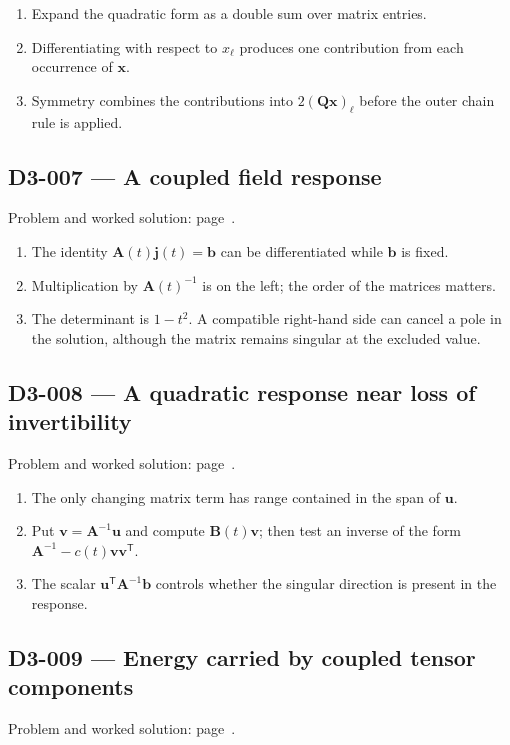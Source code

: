 \documentclass[11pt,oneside,openany]{book}
\begin{document}
\begin{enumerate}
\item Expand the quadratic form as a double sum over matrix entries.
\item Differentiating with respect to \(x_\ell\) produces one contribution from each occurrence of \(\mathbf x\).
\item Symmetry combines the contributions into \(2(\mathbf Q\mathbf x)_\ell\) before the outer chain rule is applied.
\end{enumerate}
\subsection*{D3-007 --- A coupled field response}
\label{hints:D3-007}
Problem and worked solution: page~\pageref{problem:D3-007}.

\begin{enumerate}
\item The identity \(\mathbf A(t)\mathbf j(t)=\mathbf b\) can be differentiated while \(\mathbf b\) is fixed.
\item Multiplication by \(\mathbf A(t)^{-1}\) is on the left; the order of the matrices matters.
\item The determinant is \(1-t^2\). A compatible right-hand side can cancel a pole in the solution, although the matrix remains singular at the excluded value.
\end{enumerate}
\subsection*{D3-008 --- A quadratic response near loss of invertibility}
\label{hints:D3-008}
Problem and worked solution: page~\pageref{problem:D3-008}.

\begin{enumerate}
\item The only changing matrix term has range contained in the span of \(\mathbf u\).
\item Put \(\mathbf v=\mathbf A^{-1}\mathbf u\) and compute \(\mathbf B(t)\mathbf v\); then test an inverse of the form \(\mathbf A^{-1}-c(t)\mathbf v\mathbf v^{\mathsf T}\).
\item The scalar \(\mathbf u^{\mathsf T}\mathbf A^{-1}\mathbf b\) controls whether the singular direction is present in the response.
\end{enumerate}
\subsection*{D3-009 --- Energy carried by coupled tensor components}
\label{hints:D3-009}
Problem and worked solution: page~\pageref{problem:D3-009}.
\end{document}
